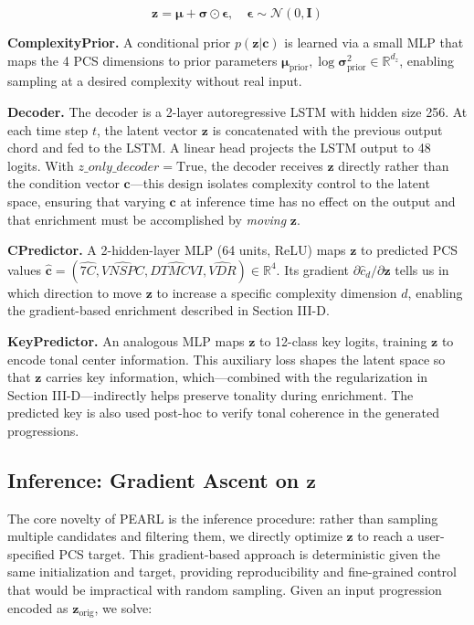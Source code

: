 \documentclass[conference]{IEEEtran}
\begin{document}
\begin{equation}
\mathbf{z} = \boldsymbol{\mu} + \boldsymbol{\sigma} \odot \boldsymbol{\epsilon}, \quad \boldsymbol{\epsilon} \sim \mathcal{N}(0, \mathbf{I})
\label{eq:reparam}
\end{equation}

\textbf{ComplexityPrior.} A conditional prior $p(\mathbf{z}|\mathbf{c})$ is learned via a small MLP that maps the 4 PCS dimensions to prior parameters $\boldsymbol{\mu}_{\text{prior}}, \log\boldsymbol{\sigma}^2_{\text{prior}} \in \mathbb{R}^{d_z}$, enabling sampling at a desired complexity without real input.

\textbf{Decoder.} The decoder is a 2-layer autoregressive LSTM with hidden size 256. At each time step $t$, the latent vector $\mathbf{z}$ is concatenated with the previous output chord and fed to the LSTM. A linear head projects the LSTM output to 48 logits. With $z\_only\_decoder{=}\text{True}$, the decoder receives $\mathbf{z}$ directly rather than the condition vector $\mathbf{c}$---this design isolates complexity control to the latent space, ensuring that varying $\mathbf{c}$ at inference time has no effect on the output and that enrichment must be accomplished by \textit{moving} $\mathbf{z}$.

\textbf{CPredictor.} A 2-hidden-layer MLP (64 units, ReLU) maps $\mathbf{z}$ to predicted PCS values $\hat{\mathbf{c}} = (\hat{7C}, \hat{VNSPC}, \hat{DTMCVI}, \hat{VDR}) \in \mathbb{R}^4$. Its gradient $\partial \hat{c}_d / \partial \mathbf{z}$ tells us in which direction to move $\mathbf{z}$ to increase a specific complexity dimension $d$, enabling the gradient-based enrichment described in Section III-D.

\textbf{KeyPredictor.} An analogous MLP maps $\mathbf{z}$ to 12-class key logits, training $\mathbf{z}$ to encode tonal center information. This auxiliary loss shapes the latent space so that $\mathbf{z}$ carries key information, which---combined with the regularization in Section III-D---indirectly helps preserve tonality during enrichment. The predicted key is also used post-hoc to verify tonal coherence in the generated progressions.

\subsection{Inference: Gradient Ascent on $\mathbf{z}$}
\label{sec:grad_ascent}

The core novelty of PEARL is the inference procedure: rather than sampling multiple candidates and filtering them, we directly optimize $\mathbf{z}$ to reach a user-specified PCS target. This gradient-based approach is deterministic given the same initialization and target, providing reproducibility and fine-grained control that would be impractical with random sampling. Given an input progression encoded as $\mathbf{z}_{\text{orig}}$, we solve:
\end{document}
